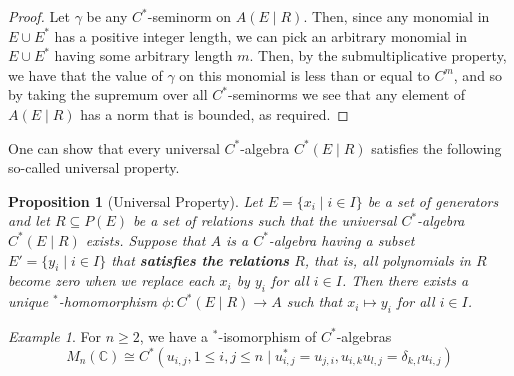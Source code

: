 \documentclass{article}
\theoremstyle{plain}
\newtheorem{proposition}[theorem]{Proposition}
\theoremstyle{definition}
\theoremstyle{remark}
\newtheorem{example}[theorem]{Example}
\begin{document}
\begin{proof}
	Let $\gamma$ be any $C^*$-seminorm on $A(E \mid R)$.
	Then, since any monomial in $E \cup E^*$ has a positive integer length,
	we can pick an arbitrary monomial in $E \cup E^*$ having some arbitrary length
	$m$.
	Then, by the submultiplicative property, we have that the value of $\gamma$
	on this monomial is less than or equal to $C^m$, and so by taking the supremum
	over all $C^*$-seminorms we see that any element of $A(E \mid R)$ has a	norm
	that is bounded, as required.
\end{proof}

One can show 
\citet[Proposition 6.7]{speich}
that every universal $C^*$-algebra $C^*(E \mid R)$
satisfies the following so-called universal property.

\begin{proposition}[Universal Property] \label{unipropCstar}
	Let $E = \{x_i \mid i \in I\}$ 
	be a set of generators and let $R \subseteq P(E)$ be a set of relations 
	such that the universal $C^*$-algebra $C^*(E \mid R)$ exists.
	Suppose that $A$ is a $C^*$-algebra having a subset
	$E' = \{y_i \mid i \in I\}$ that \textbf{satisfies the relations} $R$,
	that is, all polynomials in $R$ become zero when we replace each $x_i$
	by $y_i$ for all $i \in I$.
	Then there exists a unique $^*$-homomorphism $\phi : C^*(E \mid R) \rightarrow A$
	such that $x_i \mapsto y_i$ for all $i \in I$.
\end{proposition}

\begin{example}
	For $n \geq 2$, we have a $^*$-isomorphism of $C^*$-algebras
	\begin{equation}
		M_n(\mathbb{C})
		\cong
		C^*(u_{i,j}, 1 \leq i,j \leq n \mid
		u_{i,j}^* = u_{j,i},
		u_{i,k}u_{l,j} = \delta_{k,l}u_{i,j}
		)
	\end{equation}
\end{example}
\end{document}
